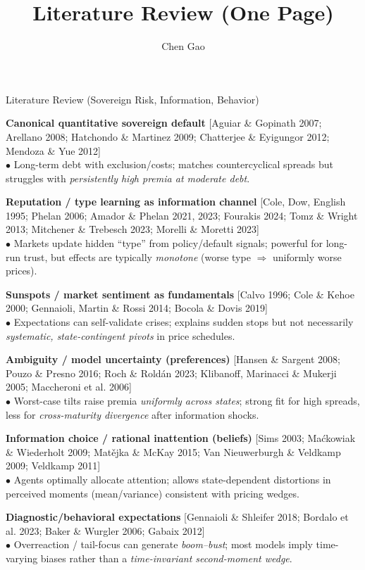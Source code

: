 \documentclass[aspectratio=169]{beamer}
\title{Literature Review (One Page)}
\author{Chen Gao}
\date{}
\begin{document}
\begin{frame}{Literature Review (Sovereign Risk, Information, Behavior)}
\footnotesize

\textbf{Canonical quantitative sovereign default} 
[Aguiar \& Gopinath 2007; Arellano 2008; Hatchondo \& Martinez 2009; Chatterjee \& Eyigungor 2012; Mendoza \& Yue 2012] \\
\quad $\bullet$ Long-term debt with exclusion/costs; matches countercyclical spreads but struggles with \emph{persistently high premia at moderate debt}. 

\vspace{0.45em}
\textbf{Reputation / type learning as information channel}
[Cole, Dow, English 1995; Phelan 2006; Amador \& Phelan 2021, 2023; Fourakis 2024; Tomz \& Wright 2013; Mitchener \& Trebesch 2023; Morelli \& Moretti 2023] \\
\quad $\bullet$ Markets update hidden ``type'' from policy/default signals; powerful for long-run trust, but effects are typically \emph{monotone} (worse type $\Rightarrow$ uniformly worse prices).

\vspace{0.45em}
\textbf{Sunspots / market sentiment as fundamentals}
[Calvo 1996; Cole \& Kehoe 2000; Gennaioli, Martin \& Rossi 2014; Bocola \& Dovis 2019] \\
\quad $\bullet$ Expectations can self-validate crises; explains sudden stops but not necessarily \emph{systematic, state-contingent pivots} in price schedules.

\vspace{0.45em}
\textbf{Ambiguity / model uncertainty (preferences)}
[Hansen \& Sargent 2008; Pouzo \& Presno 2016; Roch \& Roldán 2023; Klibanoff, Marinacci \& Mukerji 2005; Maccheroni et al. 2006] \\
\quad $\bullet$ Worst-case tilts raise premia \emph{uniformly across states}; strong fit for high spreads, less for \emph{cross-maturity divergence} after information shocks.

\vspace{0.45em}
\textbf{Information choice / rational inattention (beliefs)}
[Sims 2003; Maćkowiak \& Wiederholt 2009; Matějka \& McKay 2015; Van Nieuwerburgh \& Veldkamp 2009; Veldkamp 2011] \\
\quad $\bullet$ Agents optimally allocate attention; allows state-dependent distortions in perceived moments (mean/variance) consistent with pricing wedges.

\vspace{0.45em}
\textbf{Diagnostic/behavioral expectations}
[Gennaioli \& Shleifer 2018; Bordalo et al. 2023; Baker \& Wurgler 2006; Gabaix 2012] \\
\quad $\bullet$ Overreaction / tail-focus can generate \emph{boom–bust}; most models imply time-varying biases rather than a \emph{time-invariant second-moment wedge}.


\end{frame}
\end{document}
